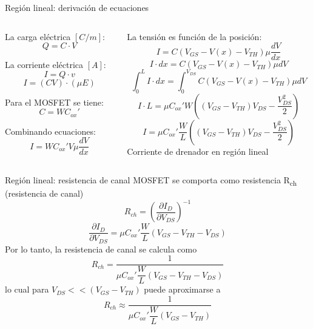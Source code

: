 \documentclass[t,aspectratio=169,10pt]{beamer}
\begin{document}
\begin{frame}{Región lineal: derivación de ecuaciones}

\begin{columns}

\begin{column}{0.5\textwidth}

La carga eléctrica $[C/m]$:
\[ Q = C \cdot V \]

La corriente eléctrica $[A]$:
\[ I = Q \cdot v \]
%
\[ I = (C V) \cdot (\mu E) \]

Para el MOSFET se tiene:
\[ C = W C_{ox}' \]

Combinando ecuaciones:
\[ I =  W C_{ox}' V \mu \dfrac{dV}{dx} \]

\end{column}

\begin{column}{0.5\textwidth}

La tensión es función de la posición:
\[ I = C \left( V_{GS} - V(x) - V_{TH} \right) \mu \dfrac{dV}{dx} \]
%
\[ I \cdot dx = C (V_{GS} - V(x) - V_{TH}) \mu dV \]
%
\[ \int_0^L I \cdot dx = \int_0^{V_{DS}} C (V_{GS} - V(x) - V_{TH}) \mu dV \]
%
\[ I \cdot L = \mu C_{ox}' W \left( (V_{GS} - V_{TH})V_{DS} - \dfrac{V_{DS}^2}{2} \right) \]
%
\[ \boxed{I = \mu C_{ox}' \dfrac{W}{L} \left( (V_{GS} - V_{TH})V_{DS} - \dfrac{V_{DS}^2}{2} \right)} \]
%
\centering Corriente de drenador en región lineal

\end{column}
    
\end{columns}


    
\end{frame}



\begin{frame}{Región lineal: resistencia de canal}
MOSFET se comporta como resistencia R\textsubscript{ch} (resistencia de canal)
%
\[ R_{ch} = \left( \dfrac{\partial I_D}{\partial V_{DS}} \right)^{-1} \]
%
\[ \dfrac{\partial I_D }{\partial V_{DS}} = \mu C_{ox}' \dfrac{W}{L} (V_{GS} - V_{TH} - V_{DS})\]
%
Por lo tanto, la resistencia de canal se calcula como
%
\[ R_{ch} = \dfrac{1}{\mu C_{ox}' \dfrac{W}{L} (V_{GS} - V_{TH} - V_{DS})} \]
%
lo cual para $V_{DS} << (V_{GS} - V_{TH})$ puede aproximarse a
%
\[ \boxed{R_{ch} \approx \dfrac{1}{\mu C_{ox}' \dfrac{W}{L} (V_{GS} - V_{TH})}} \]
\end{frame}
\end{document}
